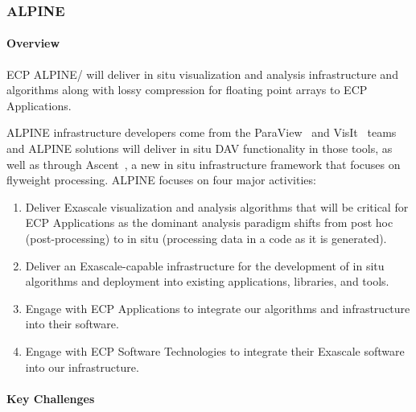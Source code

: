 
\subsubsection{ ALPINE} 


\paragraph{Overview} 

ECP ALPINE/{\zfp} will deliver in situ visualization and analysis infrastructure and algorithms along with lossy compression for floating point arrays to ECP Applications.  

ALPINE infrastructure developers come from the ParaView~\cite{alpine:Paraview1,alpine:Paraview2} and VisIt~\cite{alpine:VisIt} teams and ALPINE solutions will deliver in situ DAV functionality in those tools, as well as through Ascent~\cite{alpine:Ascent}, a new in situ infrastructure framework that focuses on flyweight processing. 
%
ALPINE  focuses on four major activities: 
\begin{enumerate}
        \setlength{\itemsep}{1pt}
        \setlength{\parskip}{0pt}
        \setlength{\parsep}{0pt}
\item Deliver Exascale visualization and analysis algorithms that will be critical for ECP Applications as the dominant analysis paradigm shifts from post hoc (post-processing) to in situ (processing data in a code as it is generated). 
\item Deliver an Exascale-capable infrastructure for the development of in situ algorithms and deployment into existing applications, libraries, and tools. 
\item Engage with ECP Applications to integrate our algorithms and infrastructure into their software. 
\item Engage with ECP Software Technologies to integrate their Exascale software into our infrastructure. 
\end{enumerate}


\paragraph{Key  Challenges}

